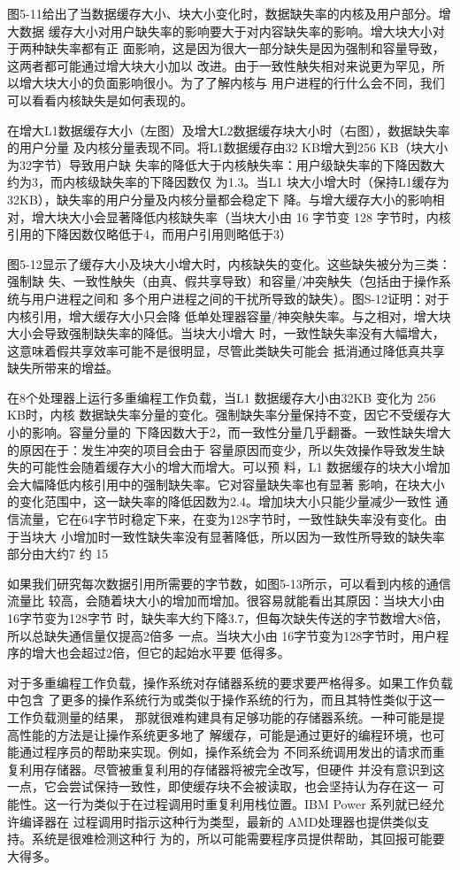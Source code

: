 图5-11给出了当数据缓存大小、块大小变化时，数据缺失率的内核及用户部分。增大数据
缓存大小对用户缺失率的影响要大于对内容缺失率的影响。增大块大小对于两种缺失率都有正
面影响，这是因为很大一部分缺失是因为强制和容量导致，这两者都可能通过增大块大小加以
改进。由于一致性觖失相对来说更为罕见，所以增大块大小的负面影响很小。为了了解内核与
用户进程的行什么会不同，我们可以看看内核缺失是如何表现的。

在增大L1数据缓存大小（左图）及增大L2数据缓存块大小时（右图），数据缺失率的用户分量
及内核分量表现不同。将L1数据缓存由32 KB增大到256 KB（块大小为32字节）导致用户缺
失率的降低大于内核觖失率：用户级缺失率的下降因数大约为3，而内核级缺失率的下降因数仅
为1.3。当L1 块大小增大时（保持L1缓存为32KB），缺失率的用户分量及内核分量都会稳定下
降。与增大缓存大小的影响相对，增大块大小会显著降低内核缺失率（当块大小由 16 字节变
128 字节时，内核引用的下降因数仅略低于4，而用户引用则略低于3）

图5-12显示了缓存大小及块大小增大时，内核缺失的变化。这些缺失被分为三类：强制缺
失、一致性觖失（由真、假共享导致）和容量/冲突觖失（包括由于操作系统与用户进程之间和
多个用户进程之间的干扰所导致的缺失）。图S-12证明：对于内核引用，增大缓存大小只会降
低单处理器容量/神突觖失率。与之相对，增大块大小会导致强制缺失率的降低。当块大小增大
时，一致性缺失率没有大幅增大，这意味着假共享效率可能不是很明显，尽管此类缺失可能会
抵消通过降低真共享缺失所带来的增益。

在8个处理器上运行多重编程工作负载，当L1 数据缓存大小由32KB 变化为 256 KB时，内核
数据缺失率分量的变化。强制缺失率分量保持不变，因它不受缓存大小的影响。容量分量的
下降因数大于2，而一致性分量几乎翻番。一致性缺失增大的原因在于：发生冲突的项目会由于
容量原因而变少，所以失效操作导致发生缺失的可能性会随着缓存大小的增大而增大。可以预
料，L1 数据缓存的块大小增加会大幅降低内核引用中的强制缺失率。它对容量缺失率也有显著
影响，在块大小的变化范围中，这一缺失率的降低因数为2.4。增加块大小只能少量减少一致性
通信流量，它在64字节时稳定下来，在变为128字节时，一致性缺失率没有变化。由于当块大
小增加时一致性缺失率没有显著降低，所以因为一致性所导致的缺失率部分由大约7%
约 15%

如果我们研究每次数据引用所需要的字节数，如图5-13所示，可以看到内核的通信流量比
较高，会随着块大小的增加而增加。很容易就能看出其原因：当块大小由16字节变为128字节
时，缺失率大约下降3.7，但每次缺失传送的字节数增大8倍，所以总缺失通信量仅提高2倍多
一点。当块大小由 16字节变为128字节时，用户程序的增大也会超过2倍，但它的起始水平要
低得多。

对于多重编程工作负载，操作系统对存储器系统的要求要严格得多。如果工作负载中包含
了更多的操作系统行为或类似于操作系统的行为，而且其特性类似于这一工作负载测量的结果，
那就很难构建具有足够功能的存储器系统。一种可能是提高性能的方法是让操作系统更多地了
解缓存，可能是通过更好的编程环境，也可能通过程序员的帮助来实现。例如，操作系统会为
不同系统调用发出的请求而重复利用存储器。尽管被重复利用的存储器将被完全改写，但硬件
并没有意识到这一点，它会尝试保持一致性，即使缓存块不会被读取，也会坚持认为存在这一
可能性。这一行为类似于在过程调用时重复利用栈位置。IBM Power 系列就已经允许编译器在
过程调用时指示这种行为类型，最新的 AMD处理器也提供类似支持。系统是很难检测这种行
为的，所以可能需要程序员提供帮助，其回报可能要大得多。

